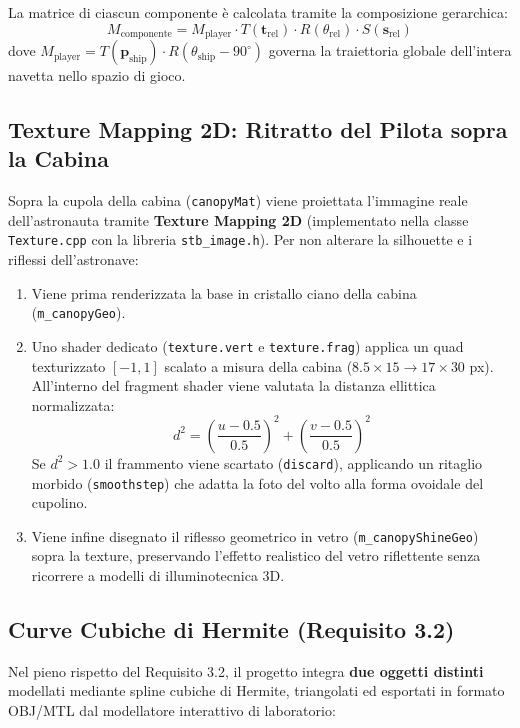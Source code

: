\documentclass[11pt,a4paper]{article}
\begin{document}
\noindent La matrice di ciascun componente è calcolata tramite la composizione gerarchica:
\begin{equation}
M_{\text{componente}} = M_{\text{player}} \cdot T(\mathbf{t}_{\text{rel}}) \cdot R(\theta_{\text{rel}}) \cdot S(\mathbf{s}_{\text{rel}})
\end{equation}
dove $M_{\text{player}} = T(\mathbf{p}_{\text{ship}}) \cdot R(\theta_{\text{ship}} - 90^\circ)$ governa la traiettoria globale dell'intera navetta nello spazio di gioco.

\subsection{Texture Mapping 2D: Ritratto del Pilota sopra la Cabina}
Sopra la cupola della cabina (\texttt{canopyMat}) viene proiettata l'immagine reale dell'astronauta tramite \textbf{Texture Mapping 2D} (implementato nella classe \texttt{Texture.cpp} con la libreria \texttt{stb\_image.h}). Per non alterare la silhouette e i riflessi dell'astronave:
\begin{enumerate}
    \item Viene prima renderizzata la base in cristallo ciano della cabina (\texttt{m\_canopyGeo}).
    \item Uno shader dedicato (\texttt{texture.vert} e \texttt{texture.frag}) applica un quad texturizzato $[-1,1]$ scalato a misura della cabina ($8.5 \times 15 \to 17 \times 30$ px). All'interno del fragment shader viene valutata la distanza ellittica normalizzata:
    \begin{equation}
    d^2 = \left(\frac{u - 0.5}{0.5}\right)^2 + \left(\frac{v - 0.5}{0.5}\right)^2
    \end{equation}
    Se $d^2 > 1.0$ il frammento viene scartato (\texttt{discard}), applicando un ritaglio morbido (\texttt{smoothstep}) che adatta la foto del volto alla forma ovoidale del cupolino.
    \item Viene infine disegnato il riflesso geometrico in vetro (\texttt{m\_canopyShineGeo}) sopra la texture, preservando l'effetto realistico del vetro riflettente senza ricorrere a modelli di illuminotecnica 3D.
\end{enumerate}

\subsection{Curve Cubiche di Hermite (Requisito 3.2)}
Nel pieno rispetto del Requisito 3.2, il progetto integra \textbf{due oggetti distinti} modellati mediante spline cubiche di Hermite, triangolati ed esportati in formato OBJ/MTL dal modellatore interattivo di laboratorio:
\end{document}
